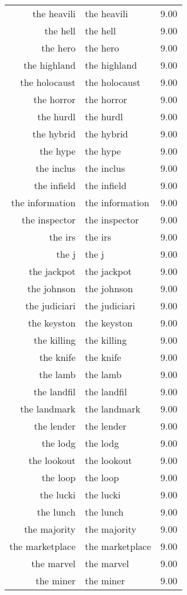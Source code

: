 \begin{table}[ht]
\begin{tabular}{rlr}
  the heavili & the heavili & 9.00 \\ 
  the hell & the hell & 9.00 \\ 
  the hero & the hero & 9.00 \\ 
  the highland & the highland & 9.00 \\ 
  the holocaust & the holocaust & 9.00 \\ 
  the horror & the horror & 9.00 \\ 
  the hurdl & the hurdl & 9.00 \\ 
  the hybrid & the hybrid & 9.00 \\ 
  the hype & the hype & 9.00 \\ 
  the inclus & the inclus & 9.00 \\ 
  the infield & the infield & 9.00 \\ 
  the information & the information & 9.00 \\ 
  the inspector & the inspector & 9.00 \\ 
  the irs & the irs & 9.00 \\ 
  the j & the j & 9.00 \\ 
  the jackpot & the jackpot & 9.00 \\ 
  the johnson & the johnson & 9.00 \\ 
  the judiciari & the judiciari & 9.00 \\ 
  the keyston & the keyston & 9.00 \\ 
  the killing & the killing & 9.00 \\ 
  the knife & the knife & 9.00 \\ 
  the lamb & the lamb & 9.00 \\ 
  the landfil & the landfil & 9.00 \\ 
  the landmark & the landmark & 9.00 \\ 
  the lender & the lender & 9.00 \\ 
  the lodg & the lodg & 9.00 \\ 
  the lookout & the lookout & 9.00 \\ 
  the loop & the loop & 9.00 \\ 
  the lucki & the lucki & 9.00 \\ 
  the lunch & the lunch & 9.00 \\ 
  the majority & the majority & 9.00 \\ 
  the marketplace & the marketplace & 9.00 \\ 
  the marvel & the marvel & 9.00 \\ 
  the miner & the miner & 9.00 \\ 

\end{tabular}
\end{table}
